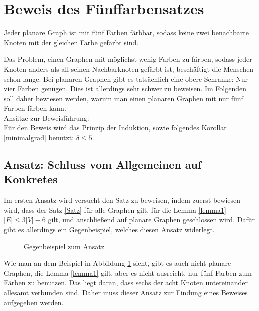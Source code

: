 \section{Beweis des Fünffarbensatzes}
\begin{satz} \label{Satz}
Jeder planare Graph ist mit fünf Farben färbbar, sodass keine zwei benachbarte Knoten mit der gleichen Farbe gefärbt sind.
\end{satz}
Das Problem, einen Graphen mit möglichst wenig Farben zu färben, sodass jeder Knoten anders als all seinen Nachbarknoten gefärbt ist, beschäftigt die Menschen schon lange. Bei planaren Graphen gibt es tatsächlich eine obere Schranke: Nur vier Farben genügen. Dies ist allerdings sehr schwer zu beweisen. Im Folgenden soll daher bewiesen werden, warum man einen planaren Graphen mit nur fünf Farben färben kann.\\
Ansätze zur Beweisführung:\\
Für den Beweis wird das Prinzip der Induktion, sowie folgendes Korollar \ref{minimalgrad} benutzt: $\delta \leq 5$.\\
\subsection{Ansatz: Schluss vom Allgemeinen auf Konkretes}
Im ersten Ansatz wird versucht den Satz zu beweisen, indem zuerst bewiesen wird, dass der Satz \ref{Satz} für alle Graphen gilt, für die Lemma \ref{lemma1} $|E|\leq3|V|-6$ gilt, und anschließend auf planare Graphen geschlossen wird.
Dafür gibt es allerdings ein Gegenbeispiel, welches diesen Ansatz widerlegt.\\
\begin{figure}
\centering
	\caption{Gegenbeispiel zum Ansatz}
	\label{graph1}
\end{figure}
Wie man an dem Beispiel in Abbildung \ref{graph1} sieht, gibt es auch nicht-planare Graphen, die Lemma \ref{lemma1} gilt, aber es nicht ausreicht, nur fünf Farben zum Färben zu benutzen. Das liegt daran, dass sechs der acht Knoten untereinander allesamt verbunden sind. Daher muss dieser Ansatz zur Findung eines Beweises aufgegeben werden.
